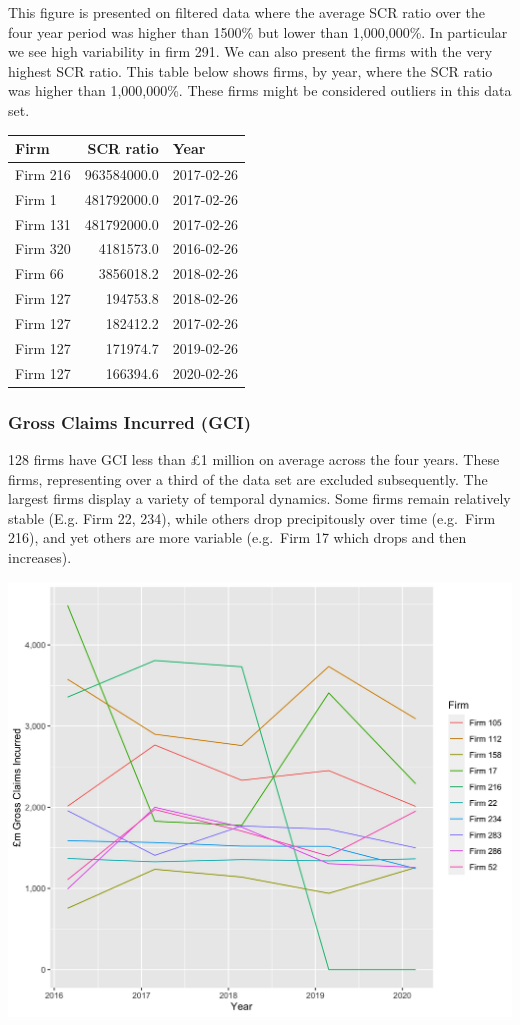 \documentclass[
]{article}
\begin{document}
This figure is presented on filtered data where the average SCR ratio
over the four year period was higher than 1500\% but lower than
1,000,000\%. In particular we see high variability in firm 291. We can
also present the firms with the very highest SCR ratio. This table below
shows firms, by year, where the SCR ratio was higher than 1,000,000\%.
These firms might be considered outliers in this data set.

\begin{longtable}[]{@{}lrl@{}}
\toprule
Firm & SCR ratio & Year\tabularnewline
\midrule
\endhead
Firm 216 & 963584000.0 & 2017-02-26\tabularnewline
Firm 1 & 481792000.0 & 2017-02-26\tabularnewline
Firm 131 & 481792000.0 & 2017-02-26\tabularnewline
Firm 320 & 4181573.0 & 2016-02-26\tabularnewline
Firm 66 & 3856018.2 & 2018-02-26\tabularnewline
Firm 127 & 194753.8 & 2018-02-26\tabularnewline
Firm 127 & 182412.2 & 2017-02-26\tabularnewline
Firm 127 & 171974.7 & 2019-02-26\tabularnewline
Firm 127 & 166394.6 & 2020-02-26\tabularnewline
\bottomrule
\end{longtable}

\hypertarget{gross-claims-incurred-gci}{%
\subsubsection{Gross Claims Incurred
(GCI)}\label{gross-claims-incurred-gci}}

128 firms have GCI less than £1 million on average across the four
years. These firms, representing over a third of the data set are
excluded subsequently. The largest firms display a variety of temporal
dynamics. Some firms remain relatively stable (E.g. Firm 22, 234), while
others drop precipitously over time (e.g.~Firm 216), and yet others are
more variable (e.g.~Firm 17 which drops and then increases).

\includegraphics[width=1\linewidth]{../figs/gross_claims_incurred_plot}
\end{document}

